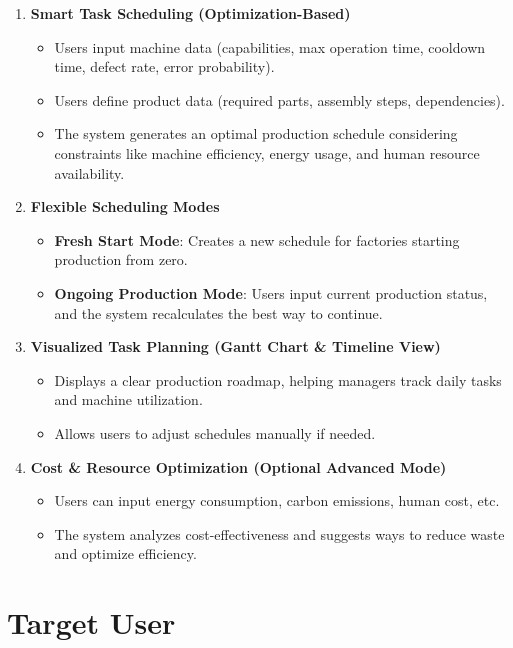 \begin{enumerate}[leftmargin=80pt]
    \item \textbf{Smart Task Scheduling (Optimization-Based)}
    \begin{itemize}
        \item Users input machine data (capabilities, max operation time, cooldown time, defect rate, error probability).
        \item Users define product data (required parts, assembly steps, dependencies).
        \item The system generates an optimal production schedule considering constraints like machine efficiency, energy usage, and human resource availability.
    \end{itemize}

    \item \textbf{Flexible Scheduling Modes}
    \begin{itemize}
        \item \textbf{Fresh Start Mode}: Creates a new schedule for factories starting production from zero.
        \item \textbf{Ongoing Production Mode}: Users input current production status, and the system recalculates the best way to continue.
    \end{itemize}

    \item \textbf{Visualized Task Planning (Gantt Chart \& Timeline View)}
    \begin{itemize}
        \item Displays a clear production roadmap, helping managers track daily tasks and machine utilization.
        \item Allows users to adjust schedules manually if needed.
    \end{itemize}

    \item \textbf{Cost \& Resource Optimization (Optional Advanced Mode)}
    \begin{itemize}
        \item Users can input energy consumption, carbon emissions, human cost, etc.
        \item The system analyzes cost-effectiveness and suggests ways to reduce waste and optimize efficiency.
    \end{itemize}

\end{enumerate}

\section{Target User}
\label{section:target-user}

